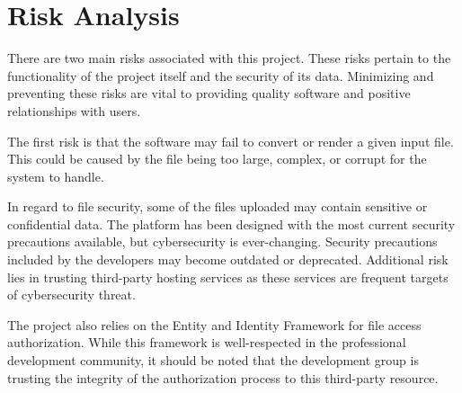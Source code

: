 
\section{Risk Analysis}
There are two main risks associated with this project. These risks pertain to the functionality of the project itself and the security of its data. Minimizing and preventing these risks are vital to providing quality software and positive relationships with users.

The first risk is that the software may fail to convert or render a given input file. This could be caused by the file being too large, complex, or corrupt for the system to handle. 

In regard to file security, some of the files uploaded may contain sensitive or confidential data. The platform has been designed with the most current security precautions available, but cybersecurity is ever-changing. Security precautions included by the developers may become outdated or deprecated. Additional risk lies in trusting third-party hosting services as these services are frequent targets of cybersecurity threat. 

The project also relies on the Entity and Identity Framework for file access authorization. While this framework is well-respected in the professional development community, it should be noted that the development group is trusting the integrity of the authorization process to this third-party resource.
